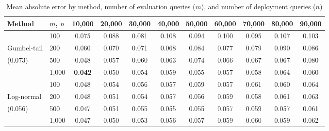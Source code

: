 \begin{table}[h]
\centering
\begin{tabular}{llccccccccc}
\toprule
Method & $m$, $n$ & 10,000 & 20,000 & 30,000 & 40,000 & 50,000 & 60,000 & 70,000 & 80,000 & 90,000 \\
\midrule
& 100 & 0.075 & 0.088 & 0.081 & 0.108 & 0.094 & 0.100 & 0.095 & 0.107 & 0.103 \\
Gumbel-tail & 200 & 0.060 & 0.070 & 0.071 & 0.068 & 0.084 & 0.077 & 0.079 & 0.090 & 0.086 \\
(0.073) & 500 & 0.048 & 0.057 & 0.060 & 0.063 & 0.074 & 0.066 & 0.067 & 0.067 & 0.080 \\
& 1,000 & \textbf{0.042} & 0.050 & 0.054 & 0.059 & 0.055 & 0.057 & 0.058 & 0.064 & 0.060 \\
\midrule
 & 100 & 0.048 & 0.054 & 0.056 & 0.057 & 0.059 & 0.057 & 0.061 & 0.060 & 0.064 \\
Log-normal & 200 & 0.048 & 0.051 & 0.054 & 0.057 & 0.056 & 0.059 & 0.058 & 0.061 & 0.063 \\
(0.056) & 500 & 0.047 & 0.051 & 0.055 & 0.055 & 0.055 & 0.057 & 0.059 & 0.057 & 0.061 \\
& 1,000 & 0.047 & 0.050 & 0.053 & 0.056 & 0.057 & 0.059 & 0.060 & 0.059 & 0.062 \\
\bottomrule
\end{tabular}
\caption{Mean absolute error by method, number of evaluation queries ($m$), and number of deployment queries ($n$)}
\end{table}


